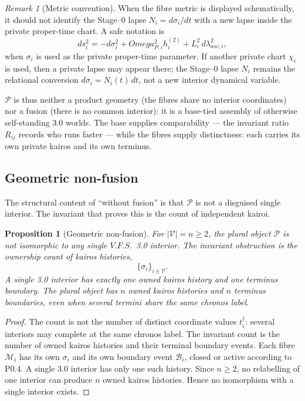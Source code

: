 \documentclass[11pt,a4paper]{article}
\def\Omega{Omega}%
\def\mathrm#1{#1}%
\def\emph#1{#1}%
\newcommand{\VFS}{\ensuremath{\mathrm{V.F.S.}}}
\theoremstyle{definition}
\theoremstyle{plain}
\newtheorem{proposition}[definition]{Proposition}
\theoremstyle{remark}
\newtheorem{remark}[definition]{Remark}
\begin{document}
\begin{remark}[Metric convention]
When the fibre metric is displayed schematically, it should not identify the
Stage--0 lapse \(N_i=d\sigma_i/dt\) with a new lapse inside the private proper-time
chart. A safe notation is
\[
ds_i^2
=
-d\sigma_i^2
+
\Omega_{P,i}^2 h^{(2)}_i
+
L_i^2\,d\lambda_{\mathrm{asc},i}^2,
\]
when \(\sigma_i\) is used as the private proper-time parameter. If another private
chart \(\chi_i\) is used, then a private lapse may appear there; the Stage--0 lapse
\(N_i\) remains the relational conversion \(d\sigma_i=N_i(t)\,dt\), not a new
interior dynamical variable.
\end{remark}

\(\mathcal P\) is thus neither a product geometry (the fibres share no interior
coordinates) nor a fusion (there is no common interior): it is a base-tied assembly of
otherwise self-standing 3.0 worlds. The base supplies \emph{comparability} --- the
invariant ratio \(R_{ij}\) records who runs faster --- while the fibres supply
\emph{distinctness}: each carries its own private kairos and its own terminus.

\subsection{Geometric non-fusion}

The structural content of ``without fusion'' is that \(\mathcal P\) is not a disguised
single interior. The invariant that proves this is the count of independent kairoi.

\begin{proposition}[Geometric non-fusion]\label{prop:nonfusion}
For \(|\mathcal V|=n\ge2\), the plural object \(\mathcal P\) is not isomorphic to
any single \VFS\ 3.0 interior. The invariant obstruction is the ownership count of
kairos histories,
\[
\{\sigma_i\}_{i\in\mathcal V}.
\]
A single 3.0 interior has exactly one owned kairos history and one terminus
boundary. The plural object has \(n\) owned kairos histories and \(n\) terminus
boundaries, even when several termini share the same chronos label.
\end{proposition}

\begin{proof}
The count is not the number of distinct coordinate values \(t_i^\dagger\): several
interiors may complete at the same chronos label. The invariant count is the number
of owned kairos histories and their terminal boundary events. Each fibre
\(\mathcal M_i\) has its own \(\sigma_i\) and its own boundary event
\(\mathcal B_i\), closed or active according to P0.4. A single 3.0 interior has only
one such history. Since \(n\ge2\), no relabelling of one interior can produce \(n\)
owned kairos histories. Hence no isomorphism with a single interior exists.
\qedhere
\end{proof}
\end{document}

